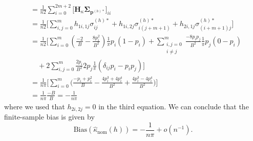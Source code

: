﻿\documentclass[12pt,a4paper]{scrreprt}
\theoremstyle{definition}
\begin{document}
\begin{appendices}
\begin{align*}
    &=\frac{1}{n2}\sum_{i=0}^{2m+2}\bigl[\boldsymbol{H}_\kappa\boldsymbol{\Sigma}_{\boldsymbol{p}^{(h)*}}\bigr]_{ii}  \\
    &=\frac{1}{n2}\Biggl[\sum_{i,  j =0}^{m}h_{1i,1j}\sigma^{(h)*}_{ij}+h_{1i,2j}\sigma^{(h)*}_{i(j+m+1)}
    +h_{2i,1j}\sigma^{(h)*}_{(i+m+1)j}\Biggr]\\
    &= \frac{1}{n2}\Biggl[\sum_{i = 0}^{m}(\frac{-2}{B} - \frac{8p_i^2}{B^2}) \frac{1}{\pi}p_i(1-p_i)
     + \sum_{\substack{i,j = 0\\ i \neq j}}^{m} \frac{-8 p_i p_j }{B^2} \frac{1}{\pi}p_j(0-p_i) \\
    &\quad + 2 \sum_{i, j = 0}^{m} \frac{2p_i}{B^2} 2p_j \frac{1}{\pi} (\delta_{ij} p_i -  p_i p_j) \Biggr]  \\
    &= \frac{1}{ n \pi}\biggl[\sum_{i = 0}^{m} \biggl(\frac{- p_i + p_i^2 }{B} - \frac{4 p_i^3 + 4 p_i^4 }{B^2} + \frac{4p_i^3- 4p_i^4}{B^2}\biggr) \biggr] \\
    &= \frac{1}{n\pi} \frac{-B}{B} = - \frac{1}{n \pi} 
\end{align*}
where we used that $h_{2i, 2j} = 0$ in the third equation. We can conclude that the finite-sample bias is given by
\[\mathrm{Bias}(\hat{\kappa}_{\mathrm{nom}}(h)) = -\frac{1}{n \pi} + o(n^{-1}).\]
\end{appendices}


\end{document}
